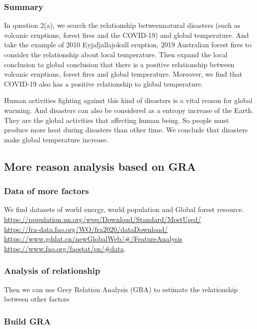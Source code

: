 \documentclass{apmcmthesis}
\begin{document}
  \subsubsection{Summary}
  In question 2(a), we search the relationship betweennatural disasters (such as volcanic eruptions, forest fires and the COVID-19) and global temperature.
  And take the example of 2010 Eyjafjallajokull eruption, 2019 Australian forest fires to consider the relationship about local temperature.
  Then expand the local conclusion to global conclusion that there is a positive relationship between volcanic eruptions, forest fires and global temperature. 
  Moreover, we find that COVID-19 also has a positive relationship to global temperature.
  
  Human activities fighting against this kind of disasters is a vital reason for global warming.
  And disasters can also be considered as a entropy increase of the Earth.
  They are the global activities that affecting human being.
  So people must produce more heat during disasters than other time.
  We conclude that disasters make global temperature increase.
  
  \subsection{More reason analysis based on GRA }
  \subsubsection{Data of more factors}
  We find datasets of world energy, world population and Global forest resource. \\
  \url{https://population.un.org/wpp/Download/Standard/MostUsed/}\\
  \url{https://fra-data.fao.org/WO/fra2020/dataDownload/}\\
  \url{https://www.gddat.cn/newGlobalWeb/#/FeatureAnalysis}\\
  \url{https://www.fao.org/faostat/en/#data}.
  
  \subsubsection{Analysis of relationship}
  Then we can use Grey Relation Analysis (GRA) to estimate the relationship between other factors
  
  \subsubsection{Build GRA}
  
\end{document}
